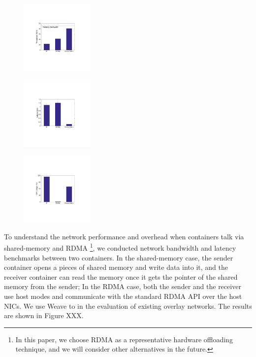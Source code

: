      \begin{figure}[ht]
     \centering 
     \includegraphics[width=0.32\textwidth]{figures/motivation/eval_baremetal_thr.pdf}      
     \label{fig:eval_baremetal_thr}
     \caption{} 
     \end{figure}

     \begin{figure}[ht]
     \centering 
     \includegraphics[width=0.32\textwidth]{figures/motivation/eval_baremetal_latency.pdf}      
     \label{fig:eval_baremetal_latency}
     \caption{} 
     \end{figure}

     \begin{figure}[ht]
     \centering 
     \includegraphics[width=0.32\textwidth]{figures/motivation/eval_baremetal_cpu.pdf}      
     \label{fig:eval_baremetal_cpu}
     \caption{} 
     \end{figure}

To understand the network performance and overhead when containers
talk via shared-memory and RDMA \footnote{In this paper, we choose RDMA
as a representative hardware offloading technique, and we will consider other
alternatives in the future.}, we conducted network bandwidth and latency benchmarks between two containers. In the shared-memory case, the sender
container opens a pieces of shared memory and write data into it, and 
the receiver container can read the memory once it gets the pointer of 
the shared memory from the sender; In the RDMA case, both the sender
and the receiver use host modes and communicate with the standard RDMA API
over the host NICs. We use Weave to in the evaluation of existing overlay
networks. The results are shown in Figure XXX.

